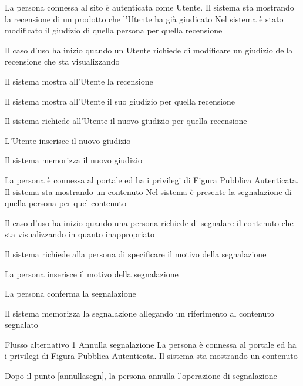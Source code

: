 {}
{La persona connessa al sito è autenticata  come Utente. Il sistema sta mostrando la recensione di un prodotto che l'Utente ha già giudicato}
{Nel sistema è stato modificato il giudizio di quella persona per quella recensione}
{\begin{enumCU}
	\item Il caso d'uso ha inizio quando un Utente richiede di modificare un giudizio della recensione che sta visualizzando
	\item Il sistema mostra all'Utente la recensione
	\item Il sistema mostra all'Utente il suo giudizio per quella recensione
	\item Il sistema richiede all'Utente il nuovo giudizio per quella recensione
	\item L'Utente inserisce il nuovo giudizio
	\item Il sistema memorizza il nuovo giudizio
\end{enumCU}}


{}
{La persona è connessa al portale ed ha i privilegi di Figura Pubblica Autenticata. Il sistema sta mostrando un \gls{contenuto}}
{Nel sistema è presente la segnalazione di quella persona per quel contenuto}
{\begin{enumCU}
	\item Il caso d'uso ha inizio quando una persona richiede di segnalare il \gls{contenuto} che sta visualizzando in quanto inappropriato
	\item Il sistema richiede alla persona di specificare il motivo della segnalazione
	\item La persona inserisce il motivo della segnalazione\label{annullasegn}
	\item La persona conferma la segnalazione
	\item Il sistema memorizza la segnalazione allegando un \gls{riferimento} al contenuto segnalato
\end{enumCU}}
%
{Flusso alternativo 1}%
{Annulla segnalazione}%
{La persona è connessa al portale ed ha i privilegi di Figura Pubblica Autenticata. Il sistema sta mostrando un \gls{contenuto}}
{\postNulle}%
{\begin{enumCU}
		\item Dopo il punto \ref{annullasegn}, la persona annulla l'operazione di segnalazione
	\end{enumCU}}%

